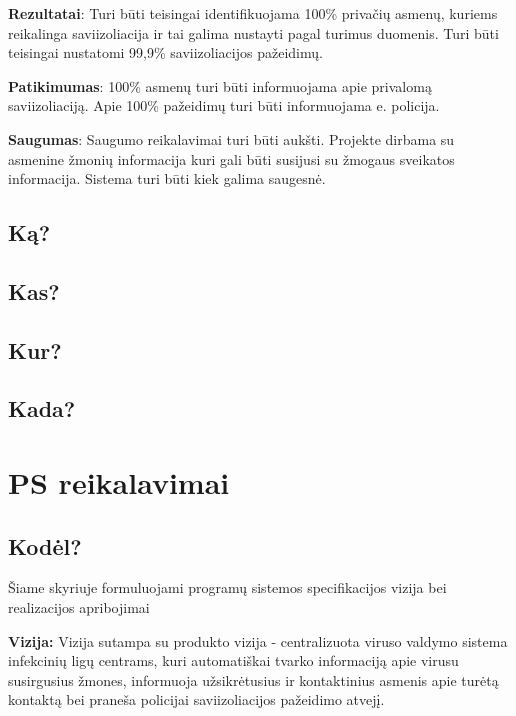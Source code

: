 \documentclass{VUMIFPSkursinis}
\begin{document}
\textbf{Rezultatai}:
Turi būti teisingai identifikuojama 100\% privačių asmenų, kuriems reikalinga saviizoliacija ir tai galima nustayti pagal turimus duomenis. 
Turi būti teisingai nustatomi 99,9\% saviizoliacijos pažeidimų.

\textbf{Patikimumas}:
100\% asmenų turi būti informuojama apie privalomą saviizoliaciją. Apie 100\% pažeidimų turi būti informuojama e. policija.

\textbf{Saugumas}:
Saugumo reikalavimai turi būti aukšti. Projekte dirbama su asmenine žmonių informacija kuri gali būti susijusi su žmogaus sveikatos informacija. Sistema turi būti kiek galima saugesnė.

\subsection{Ką?}\label{sec:ISReqWhat}
\subsection{Kas?}\label{sec:ISReqWho}
\subsection{Kur?}\label{sec:ISReqWhere}
\subsection{Kada?}\label{sec:ISReqWhen}

\section{PS reikalavimai}
 
\subsection{Kodėl?}\label{sec:PSReqWhy}
Šiame skyriuje formuluojami programų sistemos specifikacijos vizija bei realizacijos apribojimai

\textbf{Vizija:} Vizija sutampa su produkto vizija - centralizuota viruso valdymo sistema infekcinių ligų centrams, kuri automatiškai tvarko informaciją apie virusu susirgusius žmones, informuoja užsikrėtusius ir kontaktinius asmenis apie turėtą kontaktą bei praneša policijai saviizoliacijos pažeidimo atvejį.
\end{document}
